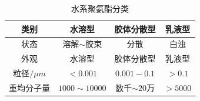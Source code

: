 \begin{table}
	\centering
	\caption{水系聚氨酯分类} \label{tab:category}
	\begin{tabular*}{0.9\textwidth}{@{\extracolsep{\fill}}cccc}
		\toprule
		类别			&水溶型		&胶体分散型		&乳液型 \\
		\midrule
		状态			&溶解$\sim$胶束	&分散		&白浊 \\
		外观			&水溶型		&胶体分散型		&乳液型 \\
		粒径$/\mu m$	&$<0.001$		&$0.001-0.1$		&$>0.1$ \\
		重均分子量	&$1000\sim 10000$	&数千$\sim 20万$ &$>5000$ \\
		\bottomrule
	\end{tabular*}
\end{table}
